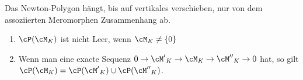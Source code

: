 \begin{lem}
\cite[Seite 26]{sabbah_cimpa90}
Das Newton-Polygon hängt, bis auf vertikales verschieben, nur von dem
assoziierten Meromorphen Zusammenhang ab.
\begin{comment}
ODER: assoziierte Meromorphen Zusammenhänge haben gleiche Slopes aber sind
möglicherweise vertikal verschoben.
\end{comment}
\end{lem}

\begin{lem}
\cite[5.1]{sabbah_cimpa90} %
\begin{enumerate}
\item $\cP(\cM_K)$ ist nicht Leer, wenn $\cM_K\neq\{0\}$
\item Wenn man eine exacte Sequenz
$0\rightarrow{\cM'}_K\rightarrow{\cM}_K\rightarrow{\cM''}_K\rightarrow0$
hat, so gilt $\cP(\cM_K)=\cP({\cM'}_K)\cup\cP({\cM''}_K)$.
\begin{comment}
Siehe auch \cite[Thm 5.3.4]{sabbah_cimpa90}

Dort Steht:\\
Wir erhalten die Exacte Sequenz
\[
0 \rightarrow \cD_{\hat K}/\cD_{\hat K} \cdot P_1
  \rightarrow \cD_{\hat K}/\cD_{\hat K} \cdot P
  \rightarrow \cD_{\hat K}/\cD_{\hat K} \cdot P_2
  \rightarrow 0
\]
\begin{cor}
\cite[Thm 5.3.4]{sabbah_cimpa90}
$\cP(P)=\cP(P_1)\cup\cP(P_2)$ und $\cP(P_1)\cap\cP(P_2)=\emptyset$
\end{cor}
\end{comment}
\end{enumerate}
\end{lem}

